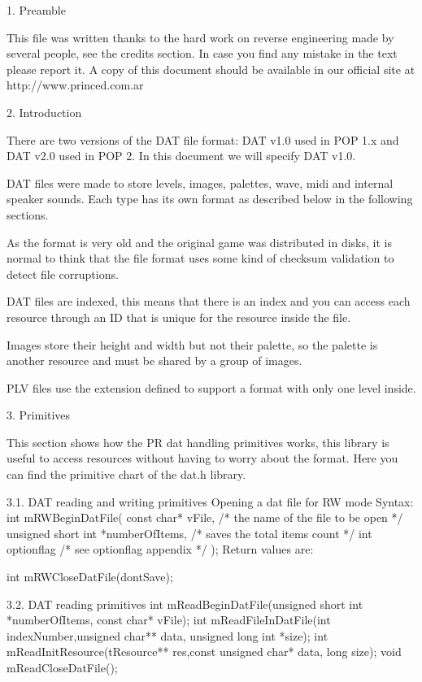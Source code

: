 1. Preamble
   ~~~~~~~~

 This file was written thanks to the hard work on reverse engineering made
 by several people, see the credits section. In case you find any mistake
 in the text please report it. A copy of this document should be available
 in our official site at http://www.princed.com.ar


2. Introduction
   ~~~~~~~~~~~~

 There are two versions of the DAT file format: DAT v1.0 used in POP 1.x
 and DAT v2.0 used in POP 2. In this document we will specify DAT v1.0.

 DAT files were made to store levels, images, palettes, wave, midi and
 internal speaker sounds. Each type has its own format as described below
 in the following sections.

 As the format is very old and the original game was distributed in disks,
 it is normal to think that the file format uses some kind of checksum
 validation to detect file corruptions.

 DAT files are indexed, this means that there is an index and you can
 access each resource through an ID that is unique for the resource inside
 the file.

 Images store their height and width but not their palette, so the palette
 is another resource and must be shared by a group of images.

 PLV files use the extension defined to support a format with only one
 level inside.


3. Primitives
   ~~~~~~~~~~

 This section shows how the PR dat handling primitives works, this library
 is useful to access resources without having to worry about the format.
 Here you can find the primitive chart of the dat.h library.

3.1. DAT reading and writing primitives
 Opening a dat file for RW mode
 Syntax:
 int mRWBeginDatFile(
  const char* vFile, /* the name of the file to be open */
  unsigned short int *numberOfItems, /* saves the total items count */
  int optionflag /* see optionflag appendix */
 );
 Return values are:

 int mRWCloseDatFile(dontSave);

3.2. DAT reading primitives
 int  mReadBeginDatFile(unsigned short int *numberOfItems,
      const char* vFile);
 int  mReadFileInDatFile(int indexNumber,unsigned char** data,
      unsigned long int *size);
 int  mReadInitResource(tResource** res,const unsigned char* data,
      long size);
 void mReadCloseDatFile();

